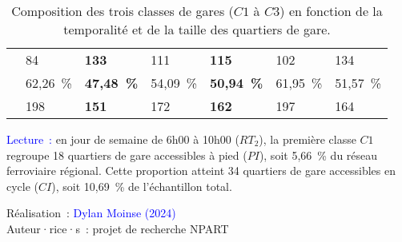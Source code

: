 \begin{table}[h!]
{\begin{tabular}{p{}p{}p{}p{}p{}p{}p{}}
& \small{84} & \textbf{\small{133}} & \small{111} & \textbf{\small{115}} & \small{102} & \small{134}\\
        \hdashline
\multirow{2}{*}{\small{Classe 3 (\(C3\))}} & \small{62,26~\%} & \textbf{\small{47,48~\%}} & \small{54,09~\%} & \textbf{\small{50,94~\%}} & \small{61,95~\%} & \small{51,57~\%}\\
& \small{198} & \textbf{\small{151}} & \small{172} & \textbf{\small{162}} & \small{197} & \small{164}\\
        \hline
        \end{tabular}}
    \caption{Composition des trois classes de gares (\(C1\) à \(C3\)) en fonction de la temporalité et de la taille des quartiers de gare.}
    \label{table-chap6:classification-periodes}
        \vspace{5pt}
        \begin{flushleft}\scriptsize{
        \textcolor{blue}{Lecture~:} en jour de semaine de 6h00 à 10h00 (\(RT_{2}\)), la première classe \(C1\) regroupe 18 quartiers de gare accessibles à pied (\(PI\)), soit 5,66~\% du réseau ferroviaire régional. Cette proportion atteint 34 quartiers de gare accessibles en cycle (\(CI\)), soit 10,69~\% de l'échantillon total.
        }\end{flushleft}
        \begin{flushright}\scriptsize{
        Réalisation~: \textcolor{blue}{Dylan Moinse (2024)}
        \\
        Auteur·rice·s~: projet de recherche \acrshort{NPART}
        }\end{flushright}
        \end{table}